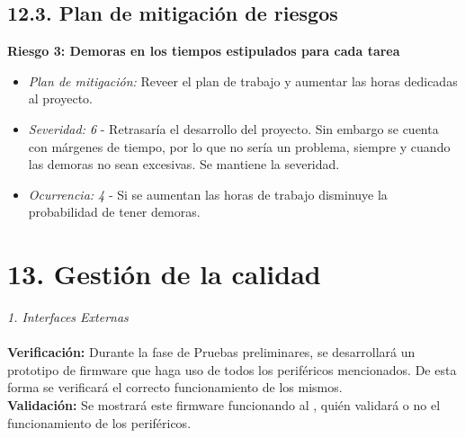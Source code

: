 \documentclass[11pt]{charter}
\begin{document}
\subsection*{12.3. Plan de mitigación de riesgos}

\begin{tcolorbox}
\textbf{Riesgo 3: Demoras en los tiempos estipulados para cada tarea}
\begin{itemize}
	\item \textit{Plan de mitigación: } Reveer el plan de trabajo y aumentar las horas dedicadas al proyecto.
	\item \textit{Severidad: 6} - Retrasaría el desarrollo del proyecto. Sin embargo se cuenta con márgenes de tiempo, por lo que no sería un problema, siempre y cuando las demoras no sean excesivas. Se mantiene la severidad.
	\item \textit{Ocurrencia: 4} - Si se aumentan las horas de trabajo disminuye la probabilidad de tener demoras.
\end{itemize}
\end{tcolorbox}

\section{13. Gestión de la calidad}
\label{sec:calidad}

\begin{tcolorbox}
\textit{1. Interfaces Externas} \\ \\
	\textbf{Verificación:} Durante la fase de Pruebas preliminares, se desarrollará un prototipo de firmware que haga uso de todos los periféricos mencionados. De esta forma se verificará el correcto funcionamiento de los mismos. \\
	\textbf{Validación:} Se mostrará este firmware funcionando al \supname , quién validará o no el funcionamiento de los periféricos. \\
\end{tcolorbox}
\end{document}
